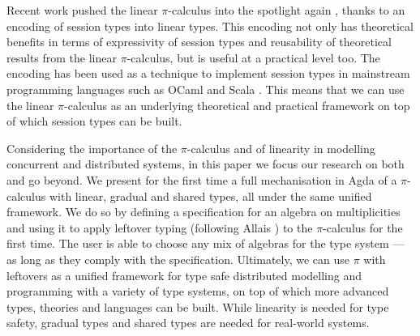 \documentclass[a4paper,UKenglish,cleveref, autoref, thm-restate,authorcolumns]{lipics-v2019}
\theoremstyle{definition}
\newcommand{\picalc}{$\pi$-calculus}
\begin{document}
Recent work \cite{DardhaGS12,Dardha14,DardhaGS17} pushed the linear \picalc{} into the spotlight again \cite{KPT96}, thanks to an encoding of session types into linear types.
This encoding not only has theoretical benefits in terms of expressivity of session types and reusability of theoretical results from the linear \picalc{}, but is useful at a practical level too.
The encoding has been used as a technique to implement session types in mainstream programming languages such as OCaml \cite{Padovani17} and Scala \cite{ScalasY16,ScalasDHY17}.
This means that we can use the linear \picalc{} as an underlying theoretical and practical framework on top of which session types can be built.

Considering the importance of the \picalc{} and of linearity in modelling concurrent and distributed systems, in this paper we focus our research on both and go beyond.
We present for the first time a full mechanisation in Agda of a \picalc{} with linear, gradual and shared types, all under the same unified framework.
We do so by defining a specification for an algebra on multiplicities and using it to apply leftover typing (following Allais \cite{Allais2018a}) to the \picalc{} for the first time.
The user is able to choose any mix of algebras for the type system --- as long as they comply with the specification.
Ultimately, we can use $\pi$ with leftovers as a unified framework for type safe distributed modelling and programming with a variety of type systems, on top of which more advanced types, theories and languages can be built.
While linearity is needed for type safety, gradual types and shared types are needed for real-world systems.
\end{document}
